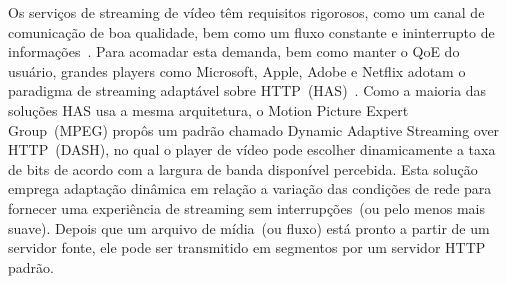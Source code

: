 

Os serviços de streaming de vídeo têm requisitos rigorosos, como um canal de comunicação de boa qualidade, bem como um fluxo constante e ininterrupto de informações~\cite{Immich2018WinNet}.
Para acomadar esta demanda, bem como manter o QoE do usuário, grandes players como Microsoft, Apple, Adobe e Netflix adotam o paradigma de streaming adaptável sobre HTTP~(HAS)~\cite{company:dashs}. Como a maioria das soluções HAS usa a mesma arquitetura, o Motion Picture Expert Group~(MPEG) propôs um padrão chamado Dynamic Adaptive Streaming over HTTP~(DASH), no qual o player de vídeo pode escolher dinamicamente a taxa de bits de acordo com a largura de banda disponível percebida.
Esta solução emprega adaptação dinâmica em relação a variação das condições de rede para fornecer uma experiência de streaming sem interrupções~(ou pelo menos mais suave). Depois que um arquivo de mídia~(ou fluxo) está pronto a partir de um servidor fonte, ele pode ser transmitido em segmentos por um servidor HTTP padrão.

